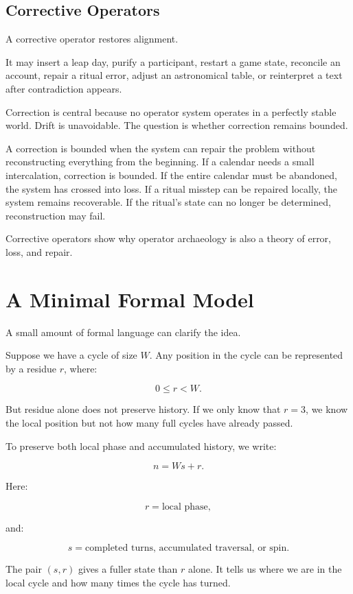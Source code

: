 \documentclass[11pt]{book}
\begin{document}
\subsection{Corrective Operators}

A corrective operator restores alignment.

It may insert a leap day, purify a participant, restart a game state, reconcile an account, repair a ritual error, adjust an astronomical table, or reinterpret a text after contradiction appears.

Correction is central because no operator system operates in a perfectly stable world. Drift is unavoidable. The question is whether correction remains bounded.

A correction is bounded when the system can repair the problem without reconstructing everything from the beginning. If a calendar needs a small intercalation, correction is bounded. If the entire calendar must be abandoned, the system has crossed into loss. If a ritual misstep can be repaired locally, the system remains recoverable. If the ritual's state can no longer be determined, reconstruction may fail.

Corrective operators show why operator archaeology is also a theory of error, loss, and repair.

\section{A Minimal Formal Model}

A small amount of formal language can clarify the idea.

Suppose we have a cycle of size \(W\). Any position in the cycle can be represented by a residue \(r\), where:

\[
0 \leq r < W.
\]

But residue alone does not preserve history. If we only know that \(r=3\), we know the local position but not how many full cycles have already passed.

To preserve both local phase and accumulated history, we write:

\[
n = Ws + r.
\]

Here:

\[
r = \text{local phase},
\]

and:

\[
s = \text{completed turns, accumulated traversal, or spin}.
\]

The pair \((s,r)\) gives a fuller state than \(r\) alone. It tells us where we are in the local cycle and how many times the cycle has turned.
\end{document}
